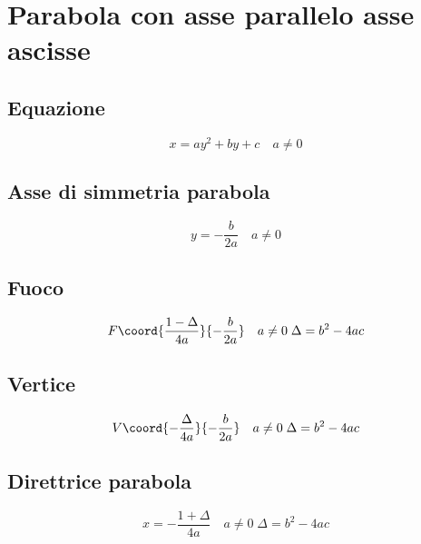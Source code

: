\chapter{Parabola con asse parallelo asse ascisse}
\section{Equazione}
\begin{equation*}
x=ay^2+by+c\quad a\neq0
\end{equation*}
\section{Asse di simmetria parabola}
\begin{equation*}
y=-\dfrac{b}{2a}\quad a\neq0
\end{equation*}
\section{Fuoco}
\begin{equation*}
F\coord{\dfrac{1-\Delta}{4a}}{-\dfrac{b}{2a}}\quad  a\neq0\; \Delta=b^2-4ac
\end{equation*}
\section{Vertice}
\begin{equation*}
V\coord{-\dfrac{\Delta}{4a}}{-\dfrac{b}{2a}}\quad  a\neq0\; \Delta=b^2-4ac
\end{equation*}
\section{Direttrice parabola}
\begin{equation*}
x=-\dfrac{1+\Delta}{4a}\quad  a\neq0\;\Delta=b^2-4ac
\end{equation*}